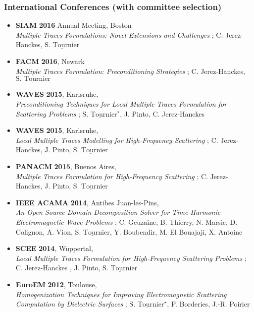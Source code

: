 \documentclass[a4paper,10pt,twoside]{article}
\newcommand\moi{$\underline{\textrm{S. Tournier}}$}
\newcommand\moistar{$\underline{\textrm{S. Tournier}}^\star$}
\begin{document}
\subsubsection*{International Conferences (with committee selection)}
\noindent
\begin{itemize}
\item[\textbullet]
  \textbf{SIAM} \textbf{2016} Annual Meeting, Boston\\
  \emph{Multiple Traces Formulations: Novel Extensions and Challenges} ;
  C. Jerez-Hanckes, \moi

\item[\textbullet]
  \textbf{FACM} \textbf{2016}, Newark\\
  \emph{Multiple Traces Formulation: Preconditioning Strategies} ;
  C. Jerez-Hanckes, \moi

\item[\textbullet]
  \textbf{WAVES} \textbf{2015}, Karlsruhe,\\
  \emph{Preconditioning Techniques
    for Local Multiple Traces Formulation for Scattering Problems} ;
  \moistar,  J. Pinto, C. Jerez-Hanckes

\item[\textbullet]
  \textbf{WAVES} \textbf{2015}, Karlsruhe,\\
  \emph{Local Multiple Traces Modelling for High-Frequency Scattering} ;
  C. Jerez-Hanckes, J. Pinto, \moi

\item[\textbullet]
  \textbf{PANACM} \textbf{2015}, Buenos Aires,\\
  \emph{Multiple Traces Formulation for High-Frequency Scattering} ;
  C. Jerez-Hanckes, J. Pinto, \moi

\item[\textbullet]
  \textbf{IEEE ACAMA} \textbf{2014}, Antibes Juan-les-Pins,\\
  \emph{An Open Source Domain Decomposition Solver for
    Time-Harmonic Electromagnetic Wave Problems} ;
  C. Geuzaine, B. Thierry, N. Marsic, D. Colignon, A. Vion, \moi,
  Y. Boubendir, M. El Bouajaji, X. Antoine

\item[\textbullet]
  \textbf{SCEE} \textbf{2014}, Wuppertal,\\
  \emph{Local Multiple Traces Formulation for High-Frequency Scattering
    Problems} ;
  C. Jerez-Hanckes , J. Pinto, \moi

\item[\textbullet]
  \textbf{EuroEM} \textbf{2012}, Toulouse,\\
  \emph{Homogenization  Techniques for Improving Electromagnetic
    Scattering Computation by Dielectric Surfaces} ;
  \moistar, P. Borderies, J.-R. Poirier


\end{itemize}
\end{document}
